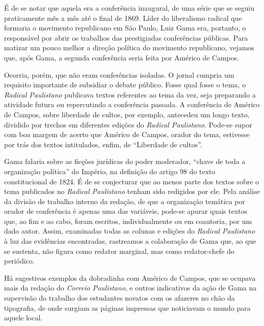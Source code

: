 É de se notar que aquela era a conferência inaugural, de uma série que
se seguiu praticamente mês a mês até o final de 1869. Líder do
liberalismo radical que formaria o movimento republicano em São Paulo,
Luiz Gama era, portanto, o responsável por abrir os trabalhos das
prestigiadas conferências públicas. Para matizar um pouco melhor a
direção política do movimento republicano, vejamos que, após Gama, a
segunda conferência seria feita por Américo de Campos.

Ocorria, porém, que não eram conferências isoladas. O jornal cumpria um
requisito importante de subsidiar o debate público. Fosse qual fosse o
tema, o \emph{Radical Paulistano} publicava textos referentes ao
tema da vez, seja preparando a atividade futura ou repercutindo a
conferência passada. A conferência de Américo de Campos, sobre liberdade
de cultos, por exemplo, antecedeu um longo texto, dividido por trechos
em diferentes edições do \emph{Radical Paulistano}. Pode-se supor com
boa margem de acerto que Américo de Campos, orador do tema, estivesse
por trás dos textos intitulados, enfim, de ``Liberdade de cultos''.

Gama falaria sobre as ficções jurídicas do poder moderador, ``chave de
toda a organização política'' do Império, na definição do artigo 98 do
texto constitucional de 1824. É de se conjecturar que ao menos parte dos
textos sobre o tema publicados no \emph{Radical Paulistano} tenham sido
redigidos por ele. Pela análise da divisão de trabalho interno da
redação, de que a organização temática por orador de conferência é
apenas uma das variáveis, pode-se apurar quais textos que, ao fim e ao
cabo, foram escritos, individualmente ou em coautoria, por um dado
autor. Assim, examinadas todas as colunas e edições do \emph{Radical
Paulistano} à luz das evidências encontradas, rastreamos a colaboração
de Gama que, ao que se sustenta, não figura como redator marginal, mas
como redator-chefe do periódico.

Há sugestivos exemplos da dobradinha com Américo de Campos, que se
ocupava mais da redação do \emph{Correio Paulistano}, e outros
indicativos da ação de Gama na supervisão do trabalho dos estudantes
novatos com os afazeres no chão da tipografia, de onde surgiam as
páginas impressas que noticiavam o mundo para aquele local.


